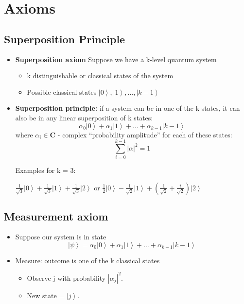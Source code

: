 \documentclass{scrartcl}
\newcommand{\ket}[1]{\left| #1 \right>} %
\begin{document}
\section{Axioms}
\label{sec:2, week 1}

\subsection {Superposition Principle}
\label{sec:2-1}

\begin{itemize}
\item{\bf Superposition axiom} Suppose we have a k-level quantum system
  \begin{itemize}
  \item k distinguishable or classical states of the system
  \item Possible classical states $\ket{0},\ket{1}, \dots , \ket{k-1}$
  \end{itemize}
\item {\bf Superposition principle:} if a system can be in one of the k states,
  it can also be in any linear superposition of k states: \[\alpha_0 \ket{0} +
  \alpha_1 \ket{1} + \dots + \alpha_{k-1} \ket{k-1} \] where $\alpha_i \in
  \mathbf{C}$ - complex ``probability amplitude'' for each of these
  states: \[\sum \limits_{i=0}^{k-1} |\alpha|^2=1\]

  Examples for k = 3:

  $\frac 1{\sqrt{3}} \ket0 + \frac1{\sqrt{3}} \ket1 + \frac1{\sqrt{3}}\ket2$ or
  $\frac1{2}\ket0 - \frac1 {\sqrt{2}}\ket1 + (\frac1{\sqrt{2}} +
  \frac{i}{\sqrt{2}}) \ket2$
\end{itemize}

\subsection{Measurement axiom}
\begin{itemize}
\item Suppose our system is in state $$\ket\psi = \alpha_0\ket0 + \alpha_1\ket1
  + \ldots + \alpha_{k-1} \ket{k-1} $$
\item Measure: outcome is one of the k classical states
  \begin{itemize}
  \item Observe j with probability $|\alpha_j|^2$.
  \item New state = $\ket j$.
  \end{itemize}
\end{itemize}
\end{document}

